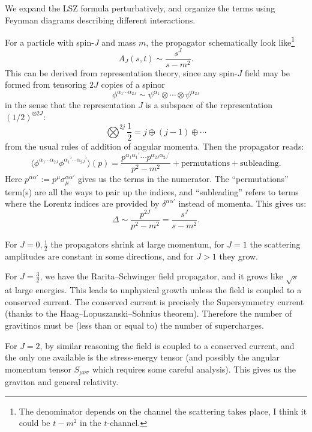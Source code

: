 We expand the LSZ formula perturbatively, and organize the terms using
Feynman diagrams describing different interactions.

For a particle with spin-$J$ and mass $m$, the propagator schematically
look like\footnote{The denominator depends on the channel the scattering
takes place, I think it could be $t-m^{2}$ in the $t$-channel.}
\begin{equation}
A_{J}(s,t) \sim \frac{s^{J}}{s-m^{2}}.
\end{equation}
This can be derived from representation theory, since any spin-$J$ field
may be formed from tensoring $2J$ copies of a spinor
\begin{equation}
\phi^{\alpha_{1}\cdots\alpha_{2J}}\sim\psi^{\alpha_{1}}\otimes\cdots\otimes\psi^{\alpha_{2J}}
\end{equation}
in the sense that the representation $J$ is a subspace of the
representation $(1/2)^{\otimes 2J}$:
\begin{equation}
\bigotimes^{2j} \frac12=j\oplus (j-1)\oplus\cdots
\end{equation}
from the usual rules of addition of angular momenta. Then the propagator
reads:
\begin{equation}
\langle\phi^{\alpha_{1}\cdots\alpha_{2J}}\phi^{\alpha_{1}'\cdots\alpha_{2J}'}\rangle(p)
=\frac{p^{\alpha_{1}\alpha_{1}'}\cdots p^{\alpha_{2J}\alpha_{2J}'}}{p^{2}-m^{2}}
+\mbox{permutations} + \mbox{subleading}.
\end{equation}
Here $p^{\alpha\alpha'}:=p^{\mu}\sigma^{\alpha\alpha'}_{\mu}$ gives us
the terms in the numerator. The ``permutations'' term(s) are all the
ways to pair up the indices, and ``subleading'' refers to terms where
the Lorentz indices are provided by $\delta^{\alpha\alpha'}$ instead of
momenta.
This gives us:
\begin{equation}
\Delta\sim\frac{p^{2J}}{p^{2} - m^{2}} = \frac{s^{J}}{s - m^{2}}.
\end{equation}

\begin{remark}
For $J=0,\frac{1}{2}$ the propagators shrink at large momentum, for
$J=1$ the scattering amplitudes are constant in some directions, and for
$J>1$ they grow.

For $J=\frac{3}{2}$, we have the Rarita--Schwinger field propagator, and
it grows like $\sqrt{s}$ at large energies. This leads to unphysical
growth unless the field is coupled to a conserved current. The conserved
current is precisely the Supersymmetry current (thanks to the
Haag--Lopuszanski--Sohnius theorem). Therefore the number of gravitinos
must be (less than or equal to) the number of supercharges.

For $J=2$, by similar reasoning the field is coupled to a conserved
current, and the only one available is the stress-energy tensor (and
possibly the angular momentum tensor $S_{\mu\nu\sigma}$ which requires
some careful analysis). This gives us the graviton and general relativity.
\end{remark}

